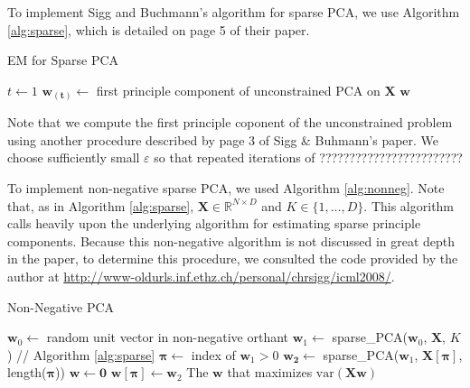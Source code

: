 \documentclass[twocolumn]{article}
\begin{document}
To implement Sigg and Buchmann's algorithm for sparse PCA,
we use Algorithm \ref{alg:sparse}, which is detailed on
page 5 of their paper.

\begin{algorithm}[H]\dontprintsemicolon
  \caption{EM for Sparse PCA}
  \label{alg:sparse}
  $t \leftarrow 1$ \;
  $\mathbf{w_{(t)}} \leftarrow$ first principle component
  of unconstrained PCA on $\mathbf{X}$ \;
  \Return $\mathbf{w}$
\end{algorithm}

Note that we compute the first principle coponent of the
unconstrained problem using another procedure described by
page 3 of Sigg \& Buhmann's paper.
We choose sufficiently small $\varepsilon$ so that repeated
iterations of ????????????????????????

To implement non-negative sparse PCA, we used Algorithm \ref{alg:nonneg}.
Note that, as in Algorithm \ref{alg:sparse},
$\mathbf{X} \in \mathds{R}^{ N\times D}$ and $K \in \{1, \ldots, D\}$.
This algorithm calls heavily upon the underlying algorithm for
estimating sparse principle components.
Because this non-negative algorithm is not discussed in great depth
in the paper, to determine this procedure, we consulted the code
provided by the author at
\url{http://www-oldurls.inf.ethz.ch/personal/chrsigg/icml2008/}.

\begin{algorithm}[H]\dontprintsemicolon
  \caption{Non-Negative PCA}
  \label{alg:nonneg}
   {
    $\mathbf{w}_0 \leftarrow$ random unit vector in non-negative orthant \;
    $\mathbf{w}_1 \leftarrow$ sparse\_PCA($\mathbf{w}_0$, $\mathbf{X}$, $K$)
      // Algorithm \ref{alg:sparse} \;
    $\boldsymbol\pi \leftarrow$ index of $\mathbf{w}_1 > 0$ \;
    $\mathbf{w_2} \leftarrow$ sparse\_PCA($\mathbf{w}_1$,
    $\mathbf{X}[\boldsymbol\pi]$, length($\boldsymbol\pi$)) \;
    $\mathbf{w} \leftarrow \mathbf{0}$ \;
    $\mathbf{w}[\boldsymbol\pi] \leftarrow \mathbf{w}_2$
  }
  \Return The $\mathbf{w}$ that maximizes $\textrm{var}(\mathbf{Xw})$
\end{algorithm}
\end{document}
